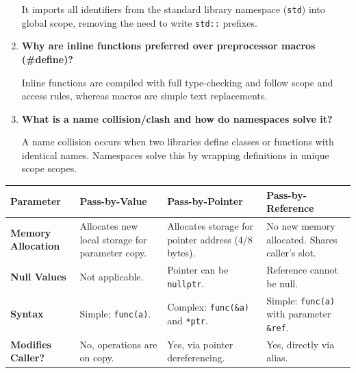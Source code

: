 \documentclass[12pt,a4paper]{article}
\newcommand{\Q}[1]{\textbf{#1}\par\noindent\ignorespaces}
\renewcommand{\arraystretch}{1.45}
\begin{document}
\begin{tcolorbox}[exambox, title={\textbf{Frequently Asked / Viva Questions}}]
\begin{enumerate}[topsep=0pt, label=\textbf{Q\arabic*.}, itemsep=5pt]
    It imports all identifiers from the standard library namespace (\texttt{std}) into global scope, removing the need to write \texttt{std::} prefixes.
  \item \Q{Why are inline functions preferred over preprocessor macros (\#define)?}
    Inline functions are compiled with full type-checking and follow scope and access rules, whereas macros are simple text replacements.
  \item \Q{What is a name collision/clash and how do namespaces solve it?}
    A name collision occurs when two libraries define classes or functions with identical names. Namespaces solve this by wrapping definitions in unique scope scopes.
\end{enumerate}
\end{tcolorbox}

\begin{tcolorbox}[tikzbox, title={Comparison of Parameter Passing Methods}]
\renewcommand{\arraystretch}{1.45}
\par\noindent
\begin{tabularx}{\linewidth}{|B{3.2cm}|Y|Y|Y|}
\hline
\textbf{Parameter} & \textbf{\color{myteal}Pass-by-Value} & \textbf{\color{myamber}Pass-by-Pointer} & \textbf{\color{mygreen}Pass-by-Reference} \\
\hline
\textbf{Memory Allocation} & Allocates new local storage for parameter copy. & Allocates storage for pointer address (4/8 bytes). & No new memory allocated. Shares caller's slot. \\
\hline
\textbf{Null Values} & Not applicable. & Pointer can be \texttt{nullptr}. & Reference cannot be null. \\
\hline
\textbf{Syntax} & Simple: \texttt{func(a)}. & Complex: \texttt{func(\&a)} and \texttt{*ptr}. & Simple: \texttt{func(a)} with parameter \texttt{\&ref}. \\
\hline
\textbf{Modifies Caller?} & No, operations are on copy. & Yes, via pointer dereferencing. & Yes, directly via alias. \\
\hline
\end{tabularx}
\end{tcolorbox}
\end{document}
